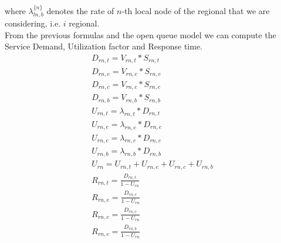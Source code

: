 \documentclass[11pt]{article}
\begin{document}
where $\lambda^{\{ n \}}_{ln, b}$ denotes the rate of $n$-th local node of the regional that we are considering, i.e. $i$ regional. \\
From the previous formulas and the open queue model we can compute the Service Demand, Utilization factor and Response time.
\begin{equation}
	\begin{array}{l}
		D_{rn, t} = V_{rn, t} * S_{rn, t} \\
		D_{rn, e} = V_{rn, e} * S_{rn, e} \\
		D_{rn, c} = V_{rn, c} * S_{rn, c} \\
		D_{rn, b} = V_{rn, b} * S_{rn, b} \\
		U_{rn, t} = \lambda_{rn, t} * D_{rn, t} \\
		U_{rn, e} = \lambda_{rn, e} * D_{rn, e} \\
		U_{rn, c} = \lambda_{rn, c} * D_{rn, c} \\
		U_{rn, b} = \lambda_{rn, b} * D_{rn, b} \\
        U_{rn} = U_{rn, t} + U_{rn, e} + U_{rn, c} + U_{rn, b} \\
		R_{rn, t} = \frac{D_{rn, t}}{1 - U_{rn}} \\
		R_{rn, e} = \frac{D_{rn, e}}{1 - U_{rn}} \\
		R_{rn, c} = \frac{D_{rn, c}}{1 - U_{rn}} \\
		R_{rn, c} = \frac{D_{rn, b}}{1 - U_{rn}} \\
	\end{array}
\end{equation}
\end{document}
